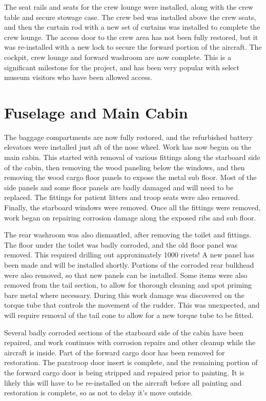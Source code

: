 The seat rails and seats for the crew lounge were installed, along
with the crew table and secure stowage case.  The crew bed was
installed above the crew seats, and then the curtain rod with a new
set of curtains was installed to complete the crew lounge.  The access
door to the crew area has not been fully restored, but it was
re-installed with a new lock to secure the forward portion of the
aircraft.  The cockpit, crew lounge and forward washroom are now
complete.  This is a significant milestone for the project, and has
been very popular with select museum visitors who have been allowed
access.

\section{Fuselage and Main Cabin}
\label{sec:main_cabin}

The baggage compartments are now fully restored, and the refurbished
battery elevators were installed just aft of the nose wheel.  Work has
now begun on the main cabin.  This started with removal of various
fittings along the starboard side of the cabin, then removing the wood
paneling below the windows, and then removing the wood cargo floor
panels to expose the metal sub floor.  Most of the side panels and
some floor panels are badly damaged and will need to be replaced.  The
fittings for patient litters and troop seats were also removed.
Finally, the starboard windows were removed.  Once all the fittings
were removed, work began on repairing corrosion damage along the
exposed ribs and sub floor.

The rear washroom was also dismantled, after removing the toilet and
fittings.  The floor under the toilet was badly corroded, and the old
floor panel was removed.  This required drilling out approximately
1000 rivets!  A new panel has been made and will be installed shortly.
Portions of the corroded rear bulkhead were also removed, so that new
panels can be installed.  Some items were also removed from the tail
section, to allow for thorough cleaning and spot priming bare metal
where necessary.  During this work damage was discovered on the torque
tube that controls the movement of the rudder.  This was unexpected,
and will require removal of the tail cone to allow for a new torque
tube to be fitted.

Several badly corroded sections of the starboard side of the cabin
have been repaired, and work continues with corrosion repairs and
other cleanup while the aircraft is inside.  Part of the forward cargo
door has been removed for restoration.  The paratroop door insert is
complete, and the remaining portion of the forward cargo door is being
stripped and repaired prior to painting.  It is likely this will have
to be re-installed on the aircraft before all painting and restoration
is complete, so as not to delay it’s move outside.

